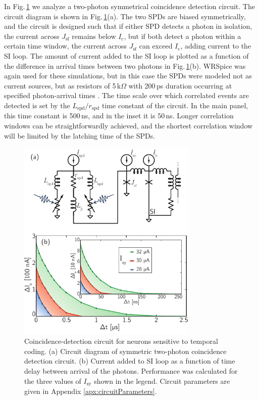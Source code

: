 \documentclass[aip,amsmath,amssymb,reprint,nofootinbib]{revtex4-1}
\begin{document}
In Fig.\,\ref{fig:receivers_coincidence} we analyze a two-photon symmetrical coincidence detection circuit. The circuit diagram is shown in Fig.\,\ref{fig:receivers_coincidence}(a). The two SPDs are biased symmetrically, and the circuit is designed such that if either SPD detects a photon in isolation, the current across $J_{\mathrm{sf}}$ remains below $I_{\mathrm{c}}$, but if both detect a photon within a certain time window, the current across $J_{\mathrm{sf}}$ can exceed $I_{\mathrm{c}}$, adding current to the SI loop. The amount of current added to the SI loop is plotted as a function of the difference in arrival times between two photons in Fig.\,\ref{fig:receivers_coincidence}(b). WRSpice was again used for these simulations, but in this case the SPDs were modeled not as current sources, but as resistors of 5\,k$\Omega$ with 200\,ps duration occurring at specified photon-arrival times \cite{yake2007}. The time scale over which correlated events are detected is set by the $L_{\mathrm{spd}}/r_{\mathrm{spd}}$ time constant of the circuit. In the main panel, this time constant is 500\,ns, and in the inset it is 50\,ns. Longer correlation windows can be straightforwardly achieved, and the shortest correlation window will be limited by the latching time of the SPDs.
\begin{figure}[t!]
	\centerline{\includegraphics[width=8.6cm]{_receivers_coincidence_small.pdf}}
	\caption{\label{fig:receivers_coincidence}Coincidence-detection circuit for neurons sensitive to temporal coding. (a) Circuit diagram of symmetric two-photon coincidence detection circuit. (b) Current added to SI loop as a function of time delay between arrival of the photons. Performance was calculated for the three values of $I_{\mathrm{sy}}$ shown in the legend. Circuit parameters are given in Appendix \ref{apx:circuitParameters}.}
\end{figure}
\end{document}
